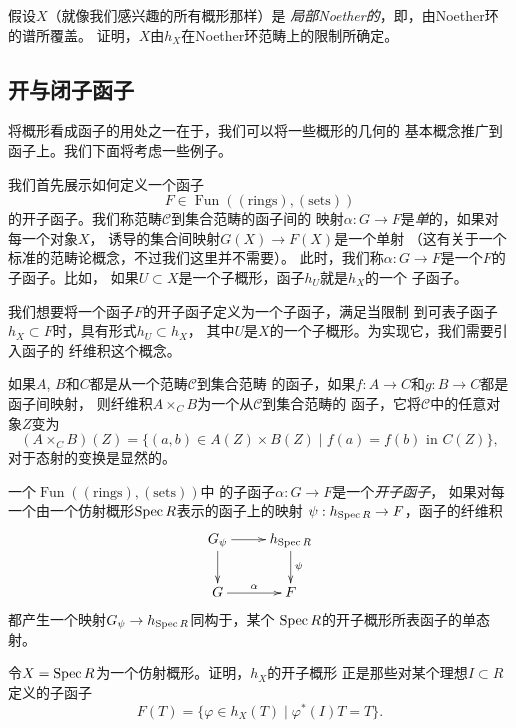 \begin{exe}
假设$X$（就像我们感兴趣的所有概形那样）是
\textit{局部Noether的}，即，由Noether环的谱所覆盖。
证明，$X$由$h_X$在Noether环范畴上的限制所确定。
\end{exe}


\subsection{开与闭子函子} \label{s:6.1.1}

将概形看成函子的用处之一在于，我们可以将一些概形的几何的
基本概念推广到函子上。我们下面将考虑一些例子。

我们首先展示如何定义一个函子
\[
	F\in \operatorname{Fun}((\text{rings}),(\text{sets}))
\]
的开子函子。我们称范畴$\mathscr C$到集合范畴的函子间的
映射$\alpha:G\to F$是\textit{单}的，如果对每一个对象$X$，
诱导的集合间映射$G(X)\to F(X)$是一个单射
（这有关于一个标准的范畴论概念，不过我们这里并不需要）。
此时，我们称$\alpha:G\to F$是一个$F$的子函子。比如，
如果$U\subset X$是一个子概形，函子$h_U$就是$h_X$的一个
子函子。

我们想要将一个函子$F$的开子函子定义为一个子函子，满足当限制
到可表子函子$h_X\subset F$时，具有形式$h_U\subset h_X$，
其中$U$是$X$的一个子概形。为实现它，我们需要引入函子的
纤维积这个概念。

\begin{defi} \label{defi:6.4}
	如果$A$, $B$和$C$都是从一个范畴$\mathscr C$到集合范畴
	的函子，如果$f:A\to C$和$g:B\to C$都是函子间映射，
	则纤维积$A\times_C B$为一个从$\mathscr C$到集合范畴的
	函子，它将$\mathscr C$中的任意对象$Z$变为
	\[
		(A\times_C B)(Z)=\{(a,b)\in A(Z)\times B(Z)
		\;|\; f(a)=f(b)\text{ in } C(Z)\},
	\]
	对于态射的变换是显然的。
\end{defi}

\begin{defi} \label{defi:6.5}
一个$\operatorname{Fun}((\text{rings}),(\text{sets}))$中
的子函子$\alpha:G\to F$是一个\textit{开子函子}，
如果对每一个由一个仿射概形$\operatorname{Spec} R$表示的函子上的映射
$\psi:h_{\operatorname{Spec} R}\to F$，函子的纤维积
\[
	\xymatrix{
		G_\psi\ar[r]\ar[d]&h_{\spec R}\ar[d]^\psi\\
		G\ar[r]^\alpha& F
	}
\]
都产生一个映射$G_\psi\to h_{\operatorname{Spec} R}$同构于，某个
$\operatorname{Spec} R$的开子概形所表函子的单态射。
\end{defi}

\begin{exe} \label{exe:6.6}
令$X=\operatorname{Spec} R$为一个仿射概形。证明，$h_X$的开子概形
正是那些对某个理想$I\subset R$定义的子函子
\[
	F(T)=\{\varphi\in h_X(T)\; | \; \varphi^*(I)T=T\}.
\]
\end{exe}

